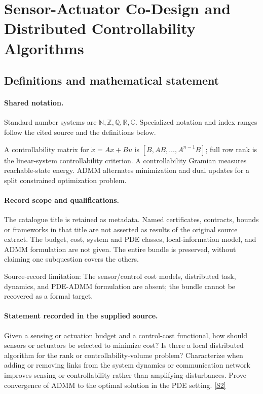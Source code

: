 \documentclass[11pt]{article}
\newcommand{\sref}[2]{\hyperlink{source:#1:#2}{[S#2]}}
\begin{document}
\section{Sensor-Actuator Co-Design and Distributed Controllability Algorithms}\label{statement}

\subsection{Definitions and mathematical statement}

\paragraph{Shared notation.}Standard number systems are $\mathbb N,\mathbb Z,\mathbb Q,\mathbb R,\mathbb C$. Specialized notation and index ranges follow the cited source and the definitions below.


A controllability matrix for $\dot x=Ax+Bu$ is $[B,AB,\ldots,A^{n-1}B]$; full row rank is the linear-system controllability criterion. A controllability Gramian measures reachable-state energy. ADMM alternates minimization and dual updates for a split constrained optimization problem.
\paragraph{Record scope and qualifications.}
The catalogue title is retained as metadata. Named certificates, contracts, bounds or frameworks in that title are not asserted as results of the original source extract.
The budget, cost, system and PDE classes, local-information model, and ADMM formulation are not given. The entire bundle is preserved, without claiming one subquestion covers the others.

Source-record limitation: The sensor/control cost models, distributed task, dynamics, and PDE-ADMM formulation are absent; the bundle cannot be recovered as a formal target.
\paragraph{Statement recorded in the supplied source.}
Given a sensing or actuation budget and a control-cost functional, how should sensors or actuators be selected to minimize cost? Is there a local distributed algorithm for the rank or controllability-volume problem? Characterize when adding or removing links from the system dynamics or communication network improves sensing or controllability rather than amplifying disturbances. Prove convergence of ADMM to the optimal solution in the PDE setting. \sref{statement}{2}
\end{document}
